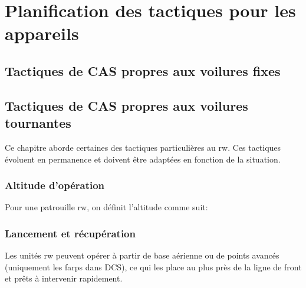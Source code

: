 \section{Planification des tactiques pour les appareils}

\subsection{Tactiques de CAS propres aux voilures fixes}

\emptypage{}

\subsection{Tactiques de CAS propres aux voilures tournantes}

\begin{e1}
	\item Ce chapitre aborde certaines des tactiques particulières au \gls{rw}. Ces tactiques évoluent en permanence et doivent être adaptées en fonction de la situation.
	\item {}
\end{e1}

\subsubsection{Altitude d'opération}

\begin{e1}
	\item Pour une patrouille \gls{rw}, on définit l'altitude comme suit:
\end{e1}

\subsubsection{Lancement et récupération}

\begin{e1}
	\item
	Les unités \gls{rw} peuvent opérer à partir de base aérienne ou de points avancés (uniquement les \glspl{farp} dans DCS), ce qui les place au plus près de la ligne de front et prêts à intervenir rapidement.
\end{e1}

